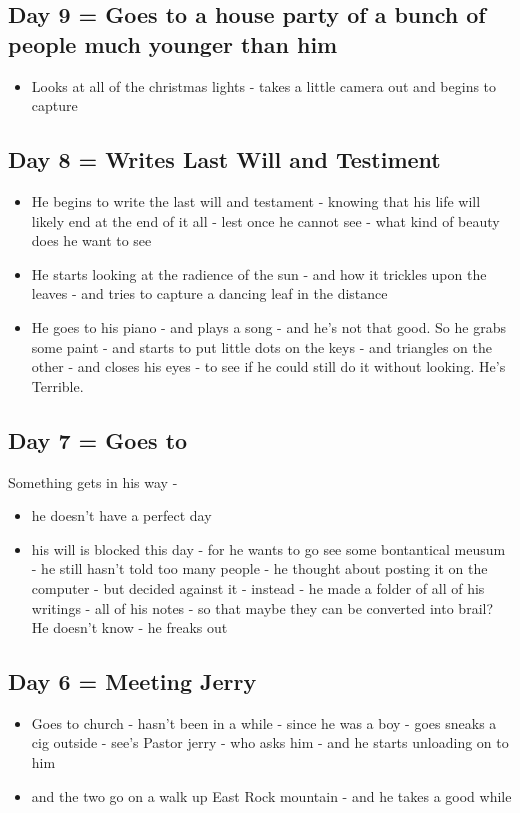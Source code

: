 \documentclass{article}
\begin{document}
\subsection*{Day 9 = Goes to a house party of a bunch of people much younger than him}
\begin{itemize}
\item Looks at all of the christmas lights - takes a little camera out and begins to capture
\end{itemize}

\subsection*{Day 8 = Writes Last Will and Testiment}
\begin{itemize}
\item He begins to write the last will and testament - knowing that his life will likely end at the end of it all - lest once he cannot see - what kind of beauty does he want to see 
\item He starts looking at the radience of the sun - and how it trickles upon the leaves - and tries to capture a dancing leaf in the distance 
\item He goes to his piano - and plays a song - and he's not that good. So he grabs some paint - and starts to put little dots on the keys - and triangles on the other - and closes his eyes - to see if he could still do it without looking. He's Terrible. 
\end{itemize}

\subsection*{Day 7 = Goes to}
Something gets in his way - 
\begin{itemize}
\item he doesn't have a perfect day 
\item his will is blocked this day - for he wants to go see some bontantical meusum - he still hasn't told too many people - he thought about posting it on the computer - but decided against it - instead - he made a folder of all of his writings - all of his notes - so that maybe they can be converted into brail? He doesn't know - he freaks out
\end{itemize}

\subsection*{Day 6 = Meeting Jerry}
\begin{itemize}
\item Goes to church - hasn't been in a while - since he was a boy - goes sneaks a cig outside - see's Pastor jerry - who asks him - and he starts unloading on to him 
\item and the two go on a walk up East Rock mountain - and he takes a good while
\end{itemize}
\end{document}
